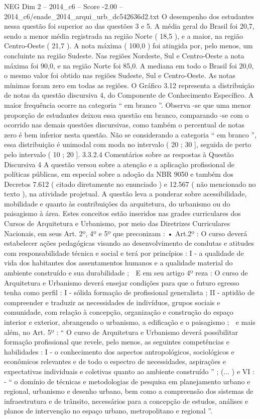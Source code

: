 \begin{textsample}{NEG Dim 2 – 2014\_c6 – Score -2.00 – 2014\_c6/enade\_2014\_arqui\_urb\_dc542636d2.txt}
O desempenho dos estudantes nessa questão foi superior ao das questões 3 e 5.
A média geral do Brasil foi 20,7, sendo a menor média registrada na região Norte ( 18,5 ), e a maior, na região Centro-Oeste ( 21,7 ).
A nota máxima ( 100,0 ) foi atingida por, pelo menos, um concluinte na região Sudeste.
Nas regiões Nordeste, Sul e Centro-Oeste a nota máxima foi 90,0, e na região Norte foi 85,0.
A mediana em todo o Brasil foi 20,0, o mesmo valor foi obtido nas regiões Sudeste, Sul e Centro-Oeste.
As notas mínimas foram zero em todas as regiões.
O Gráfico 3.12 representa a distribuição de notas da questão discursiva 4, do Componente de Conhecimento Específico.
A maior frequência ocorre na categoria “ em branco ”.
Observa -se que uma menor proporção de estudantes deixou essa questão em branco, comparando -se com o ocorrido nas demais questões discursivas, como também o percentual de notas zero é bem inferior nesta questão.
Não se considerando a categoria “ em branco ”, essa distribuição é unimodal com moda no intervalo ( 20 ; 30 ], seguida de perto pelo intervalo ( 10 ; 20 ]. 3.3.2.4 Comentários sobre as respostas à Questão Discursiva 4 A questão versou sobre a atenção e a aplicação profissional de políticas públicas, em especial sobre a adoção da NBR 9050 e também dos Decretos 7.612 ( citado diretamente no enunciado ) e 12.567 ( não mencionado no texto ), na atividade projetual.
A questão leva a ponderar sobre acessibilidade, mobilidade e quanto às contribuições da arquitetura, do urbanismo ou do paisagismo à área.
Estes conceitos estão inseridos nas grades curriculares dos Cursos de Arquitetura e Urbanismo, por meio das Diretrizes Curriculares Nacionais, em seus Art. 2º, 4º e 5º que preconizam : • Art.2º : O curso deverá estabelecer ações pedagógicas visando ao desenvolvimento de condutas e atitudes com responsabilidade técnica e social e terá por princípios : I - a qualidade de vida dos habitantes dos assentamentos humanos e a qualidade material do ambiente construído e sua durabilidade ;  E em seu artigo 4º reza : O curso de Arquitetura e Urbanismo deverá ensejar condições para que o futuro egresso tenha como perfil : I - sólida formação de profissional generalista ; II - aptidão de compreender e traduzir as necessidades de indivíduos, grupos sociais e comunidade, com relação à concepção, organização e construção do espaço interior e exterior, abrangendo o urbanismo, a edificação e o paisagismo ;  e mais além, no Art. 5º : “ O curso de Arquitetura e Urbanismo deverá possibilitar formação profissional que revele, pelo menos, as seguintes competências e habilidades : I - o conhecimento dos aspectos antropológicos, sociológicos e econômicos relevantes e de todo o espectro de necessidades, aspirações e expectativas individuais e coletivas quanto ao ambiente construído ” ; (... ) e VI : - “ o domínio de técnicas e metodologias de pesquisa em planejamento urbano e regional, urbanismo e desenho urbano, bem como a compreensão dos sistemas de infraestrutura e de trânsito, necessários para a concepção de estudos, análises e planos de intervenção no espaço urbano, metropolitano e regional ”.

\end{textsample}
